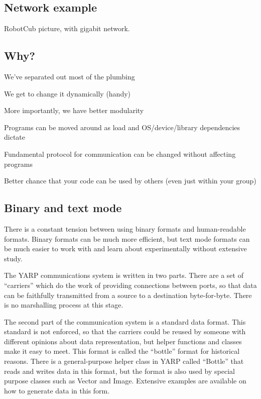 \subsection*{Network example}

RobotCub picture, with gigabit network.

\subsection*{Why?}

We've separated out most of the plumbing

We get to change it dynamically (handy)

More importantly, we have better modularity

Programs can be moved around as load and OS/device/library
 dependencies dictate

Fundamental protocol for communication can be changed without 
affecting programs

Better chance that your code can be used by others (even just within 
your group)





\subsection{Binary and text mode}

There is a constant tension between using binary formats and
human-readable formats.  Binary formats can be much more efficient,
but text mode formats can be much easier to work with and learn about
experimentally without extensive study.

The YARP communications system is written in two parts.  There
are a set of ``carriers'' which do the work of providing
connections between ports, so that data can be faithfully 
transmitted from a source to a destination byte-for-byte.
There is no marshalling process at this stage.

The second part of the communication system is a standard data format.
This standard is not enforced, so that the carriers could be reused by
someone with different opinions about data representation, but helper
functions and classes make it easy to meet.  This format is called the
``bottle'' format for historical reasons.  There is a general-purpose
helper class in YARP called ``Bottle'' that reads and writes data in
this format, but the format is also used by special purpose classes
such as Vector and Image.  Extensive examples are available on how
to generate data in this form.


